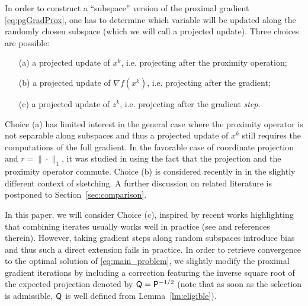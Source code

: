 In order to construct a ``subspace'' version of the proximal gradient \eqref{eq:pgGradProx}, one has to determine which variable will be updated along the randomly chosen subspace (which we will call a projected update). Three choices are possible: 
\begin{itemize}
    \item[(a)] a projected update of $x^k$,  i.e. projecting after the proximity operation;
    \item[(b)] a projected update of $\nabla f(x^k)$,  i.e. projecting after the gradient;
    \item[(c)] a projected update of $z^k$,  i.e. projecting after the gradient \emph{step}.
\end{itemize}
Choice (a) has limited interest in the general case where the proximity operator is not separable along subspaces and thus a projected update of $x^k$ still requires the computations of the full gradient. In the favorable case of coordinate projection and $r=\|\cdot\|_1$, it was studied in \cite{qu2016coordinate} using the fact that the projection and the proximity operator commute. Choice (b) is considered recently in \cite{hanzely2018sega} in the slightly different context of sketching. A further discussion on related literature is postponed to Section~\ref{sec:comparison}.

In this paper, we will consider %
Choice (c), inspired by recent works highlighting that combining iterates usually works well in practice (see \cite{mishchenko2018} and references therein). However, taking gradient steps along random subspaces introduce bias and thus such a direct extension fails in practice. In order to retrieve convergence to the optimal solution of \eqref{eq:main_problem}, we slightly modify the proximal gradient iterations by including a correction featuring the inverse square root of the expected projection denoted by $ {\mathsf{Q}}= {\mathsf{P}}^{-1/2}$ (note that as soon as the selection is admissible, $ {\mathsf{Q}}$ is well defined from Lemma~\ref{lm:eligible}).


